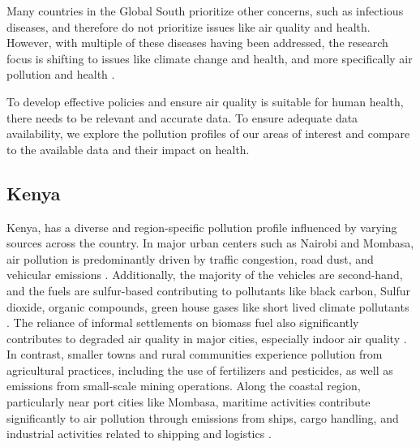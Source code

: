 \documentclass{article}
\begin{document}
Many countries in the Global South prioritize other concerns, such as infectious diseases, and therefore do not prioritize issues like air quality and health. However, with multiple of these diseases having been addressed, the research focus is shifting to issues like climate change and health, and more specifically air pollution and health \cite{fuller_pollution_2022}.  

To develop effective policies and ensure air quality is suitable for human health, there needs to be relevant and accurate data. To ensure adequate data availability, we explore the pollution profiles of our areas of interest and compare to the available data and their impact on health.

\subsection{Kenya} 
Kenya, has a diverse and region-specific pollution profile influenced by varying sources across the country. In major urban centers such as Nairobi and Mombasa, air pollution is predominantly driven by traffic congestion, road dust, and vehicular emissions \cite{singh_urban_2022}. Additionally, the majority of the vehicles are second-hand, and the fuels are sulfur-based contributing to pollutants like black carbon, Sulfur dioxide, organic compounds, green house gases like short lived climate pollutants \cite{mbandi_assessment_2023}. The reliance of informal settlements on biomass fuel also significantly contributes to degraded air quality in major cities, especially indoor air quality \cite{noauthor_analysis_nodate}. In contrast, smaller towns and rural communities experience pollution from agricultural practices, including the use of fertilizers and pesticides, as well as emissions from small-scale mining operations. Along the coastal region, particularly near port cities like Mombasa, maritime activities contribute significantly to air pollution through emissions from ships, cargo handling, and industrial activities related to shipping and logistics \cite{ogara_understanding_2025}. 
\end{document}
